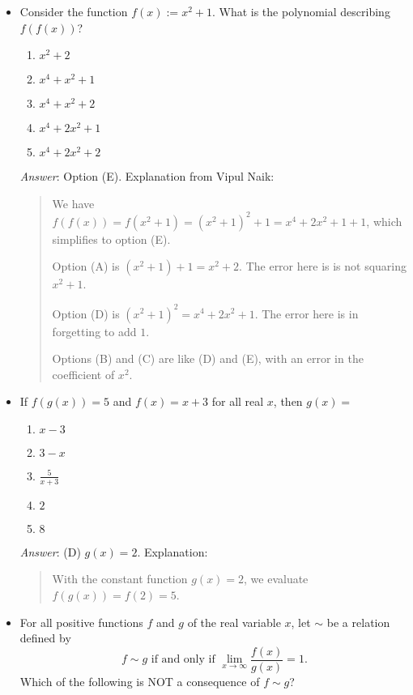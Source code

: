 \begin{itemize}
\item
  Consider the function \(f(x) := x^2 + 1\). What is the polynomial
  describing \(f(f(x))\)?

  \begin{enumerate}
  \def\labelenumi{(\Alph{enumi})}
  \tightlist
  \item
    \(x^2 + 2\)
  \item
    \(x^4 + x^2 + 1\)
  \item
    \(x^4 + x^2 + 2\)
  \item
    \(x^4 + 2x^2 + 1\)
  \item
    \(x^4 + 2x^2 + 2\)
  \end{enumerate}

  \emph{Answer}: Option (E). Explanation from Vipul Naik:

  \begin{quote}
  We have
  \(f(f(x)) = f(x^2 + 1) = (x^2 + 1)^2 + 1 = x^4 + 2x^2 + 1 + 1\), which
  simplifies to option (E).

  Option (A) is \((x^2 + 1) + 1 = x^2 + 2\). The error here is is not
  squaring \(x^2 + 1\).

  Option (D) is \((x^2 + 1)^2 = x^4 + 2x^2 + 1\). The error here is in
  forgetting to add \(1\).

  Options (B) and (C) are like (D) and (E), with an error in the
  coefficient of \(x^2\).
  \end{quote}
\item
  If \(f(g(x)) = 5\) and \(f(x) = x+3\) for all real \(x\), then
  \(g(x) =\)

  \begin{enumerate}
  \def\labelenumi{(\Alph{enumi})}
  \tightlist
  \item
    \(x-3\)
  \item
    \(3-x\)
  \item
    \(\frac{5}{x+3}\)
  \item
    \(2\)
  \item
    \(8\)
  \end{enumerate}

  \emph{Answer}: (D) \(g(x) = 2\). Explanation:

  \begin{quote}
  With the constant function \(g(x) = 2\), we evaluate
  \(f(g(x)) = f(2) = 5\).
  \end{quote}
\item
  For all positive functions \(f\) and \(g\) of the real variable \(x\),
  let \(\sim\) be a relation defined by
  \[f \sim g \text{ if and only if } \lim_{x\to \infty} \frac{f(x)}{g(x)} = 1.\]
  Which of the following is NOT a consequence of \(f \sim g\)?


\end{itemize}

